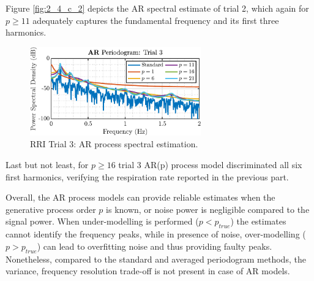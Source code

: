 \begin{enumerate}[label=\alph*), leftmargin=*]
Figure \ref{fig:2_4_c_2} depicts the AR spectral estimate of trial 2, which again for $p \geq 11$ adequately captures the fundamental frequency and its first three harmonics.

\begin{figure}[h]
    \centering
    \includegraphics[height=1.5in]{report/parametric-and-line-spectra/real-world-signals_respiratory-sinus-arrhythmia-from-RR-Intervals/assets/c/standard_ar-trial3}
    \caption{RRI Trial 3: AR process spectral estimation.}
    \label{fig:2_4_c_3}
\end{figure}

Last but not least, for $p \geq 16$ trial 3 AR(p) process model discriminated all six first harmonics, verifying the respiration rate reported in the previous part.

Overall, the AR process models can provide reliable estimates when the generative process order $p$ is known, or noise power is negligible compared to the signal power.
When under-modelling is performed ($p < p_{true}$) the estimates cannot identify the frequency peaks, while in presence of noise, over-modelling ($p > p_{true}$) can
lead to overfitting noise and thus providing faulty peaks. Nonetheless, compared to the standard and averaged periodogram methods, the variance, frequency resolution trade-off
is not present in case of AR models.

%
\end{enumerate}